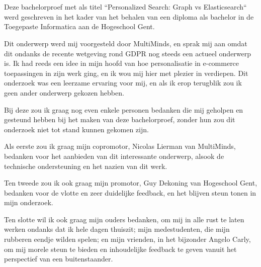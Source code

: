 
\chapter*{}
\label{ch:voorwoord}


Deze bachelorproef met als titel ``Personalized Search: Graph vs Elasticsearch`` werd geschreven in het kader van het behalen van een diploma als bachelor in de Toegepaste Informatica aan de Hogeschool Gent.

Dit onderwerp werd mij voorgesteld door MultiMinds, en sprak mij aan omdat dit ondanks de recente wetgeving rond GDPR nog steeds een actueel onderwerp is. Ik had reeds een idee in mijn hoofd  van hoe personalisatie in e-commerce toepassingen in zijn werk ging, en ik wou mij hier met plezier in verdiepen. Dit onderzoek was een leerzame ervaring voor mij, en als ik erop terugblik zou ik geen ander onderwerp gekozen hebben. 

Bij deze zou ik graag nog even enkele personen bedanken die mij geholpen en gesteund hebben bij het maken van deze bachelorproef, zonder hun zou dit onderzoek niet tot stand kunnen gekomen zijn.

Als eerste zou ik graag mijn copromotor, Nicolas Lierman van MultiMinds, bedanken voor het aanbieden van dit interessante onderwerp, alsook de technische ondersteuning en het nazien van dit werk.

Ten tweede zou ik ook graag mijn promotor, Guy Dekoning van Hogeschool Gent, bedanken voor de vlotte en zeer duidelijke feedback, en het blijven steun tonen in mijn onderzoek. 

Ten slotte wil ik ook graag mijn ouders bedanken, om mij in alle rust te laten werken ondanks dat ik hele dagen thuiszit; mijn medestudenten, die mijn rubberen eendje wilden spelen; en mijn vrienden, in het bijzonder Angelo Carly, om mij morele steun te bieden en inhoudelijke feedback te geven vanuit het perspectief van een buitenstaander.


